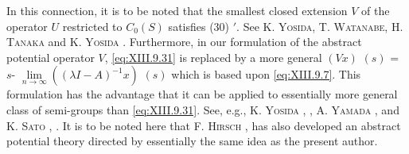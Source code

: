 In this connection, it is to be noted that the smallest closed extension $V$ of the operator $U$ restricted to $C_0(S)$ satisfies ($30$) $'$. See K. \textsc{Yosida}, T. \textsc{Watanabe}, H. \textsc{Tanaka} \cite{yosida379} and K. \textsc{Yosida} \cite{yosida380}. Furthermore, in our formulation of the abstract potential operator $V$, \eqref{eq:XIII.9.31} is replaced by a
more general $(Vx)$ $(s)$ = $s$- $\lim\limits_{n\to\infty}\left((\lambda I-A)^{-1}x\right)$ $(s)$ which is based upon \eqref{eq:XIII.9.7}. This formulation has the advantage that it can be applied to essentially more general class of semi-groups than \eqref{eq:XIII.9.31}. See, e.g., K. \textsc{Yosida} \cite{yosida380}, \cite{yosida381}, A. \textsc{Yamada} \cite{yamada343}, and K. \textsc{Sato} \cite{sato282}, \cite{sato283}. It is to be noted here that F. \textsc{Hirsch} \cite{hirsch106}, \cite{hirsch107} has also developed an abstract potential theory directed by essentially the same idea as the present author. 
